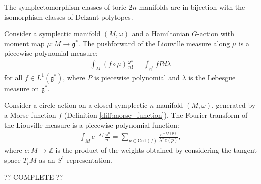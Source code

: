     \begin{theorem}[Delzant]
        The symplectomorphism classes of toric $2n$-manifolds are in bijection with the isomorphism classes of Delzant polytopes.
    \end{theorem}

    \begin{theorem}
        Consider a symplectic manifold $(M,\omega)$ and a Hamiltonian $G$-action with moment map $\mu:M\rightarrow\mathfrak{g}^*$. The pushforward of the Liouville measure along $\mu$ is a piecewise polynomial measure:
        \begin{gather}
            \int_M (f\circ\mu)\frac{\omega^n}{n!} = \int_{\mathfrak{g}^*}fPd\lambda
        \end{gather}
        for all $f\in L^1(\mathfrak{g}^*)$, where $P$ is piecewise polynomial and $\lambda$ is the Lebesgue measure on $\mathfrak{g}^*$.
    \end{theorem}
    \begin{result}[Localization]
        Consider a circle action on a closed symplectic $n$-manifold $(M,\omega)$, generated by a Morse function $f$ (Definition \ref{diff:morse_function}). The Fourier transform of the Liouville measure is a piecewise polynomial function:
        \begin{gather}
            \int_Me^{-\lambda f}\frac{\omega^n}{n!} = \sum_{p\in\text{Crit}(f)}\frac{e^{-\lambda f(p)}}{\lambda^n e(p)},
        \end{gather}
        where $e:M\rightarrow\mathbb{Z}$ is the product of the weights obtained by considering the tangent space $T_pM$ as an $S^1$-representation.
    \end{result}

    ?? COMPLETE ??

